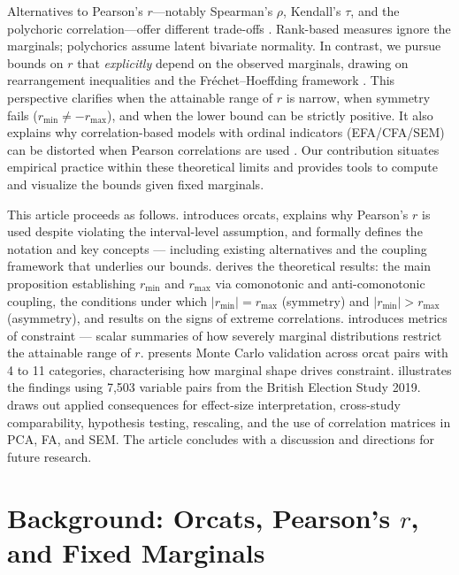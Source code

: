 \documentclass[
  12pt,
]{article}
\theoremstyle{plain}
\theoremstyle{definition}
\theoremstyle{remark}
\begin{document}
Alternatives to Pearson's \(r\)---notably Spearman's \(\rho\), Kendall's
\(\tau\), and the polychoric correlation---offer different trade-offs
\autocite{spea04-proof,kend38-new,olss79-maximum}. Rank-based measures
ignore the marginals; polychorics assume latent bivariate normality. In
contrast, we pursue bounds on \(r\) that \emph{explicitly} depend on the
observed marginals, drawing on rearrangement inequalities and the
Fréchet--Hoeffding framework
\autocite{frec51-tableaux,hoef40-masstabinvariante,rusc81-sharpness}.
This perspective clarifies when the attainable range of \(r\) is narrow,
when symmetry fails (\(r_{\min}\neq -r_{\max}\)), and when the lower
bound can be strictly positive. It also explains why correlation-based
models with ordinal indicators (EFA/CFA/SEM) can be distorted when
Pearson correlations are used \autocite{flor04-empirical,gree97-effect}.
Our contribution situates empirical practice within these theoretical
limits and provides tools to compute and visualize the bounds given
fixed marginals.

This article proceeds as follows. 
introduces orcats, explains why Pearson's \(r\) is used despite
violating the interval-level assumption, and formally defines the
notation and key concepts --- including existing alternatives and the
coupling framework that underlies our bounds. 
derives the theoretical results: the main proposition establishing
\(r_{\min}\) and \(r_{\max}\) via comonotonic and anti-comonotonic
coupling, the conditions under which \(|r_{\min}| = r_{\max}\)
(symmetry) and \(|r_{\min}| > r_{\max}\) (asymmetry), and results on the
signs of extreme correlations.  introduces
metrics of constraint --- scalar summaries of how severely marginal
distributions restrict the attainable range of \(r\).
 presents Monte Carlo validation across orcat
pairs with 4 to 11 categories, characterising how marginal shape drives
constraint.  illustrates the findings using 7,503
variable pairs from the British Election Study 2019.
 draws out applied consequences for
effect-size interpretation, cross-study comparability, hypothesis
testing, rescaling, and the use of correlation matrices in PCA, FA, and
SEM. The article concludes with a discussion and directions for future
research.

\section{\texorpdfstring{Background: Orcats, Pearson's \(r\), and Fixed
Marginals}{Background: Orcats, Pearson's r, and Fixed Marginals}}\label{sec-background}
\end{document}
